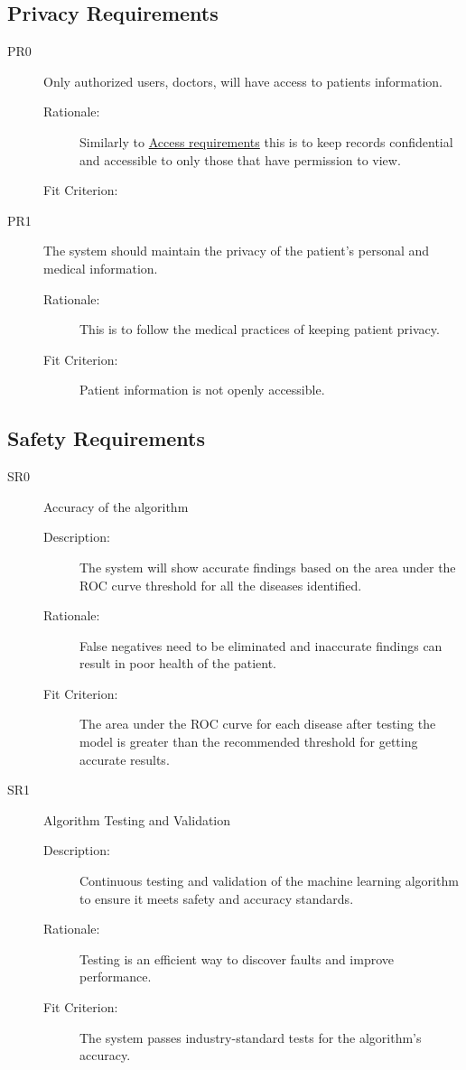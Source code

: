 \documentclass{article}
\begin{document}
\subsection{Privacy Requirements}
\begin{description}
    \item[PR0] Only authorized users, doctors, will have access to patients information. 
    \begin{description}
        \item[Rationale:] Similarly to \hyperlink{AR0}{Access requirements} this is to keep records confidential and accessible to only those that have permission to view.
        \item[Fit Criterion:] 
    \end{description}
    \item[PR1] The system should maintain the privacy of the patient’s personal and medical information.
    \begin{description}
        \item[Rationale:] This is to follow the medical practices of keeping patient privacy. 
        \item[Fit Criterion:] Patient information is not openly accessible. 
    \end{description}
\end{description}

\subsection{Safety Requirements}
\begin{description}
    \item[SR0] Accuracy of the algorithm
    \begin{description}
        \item[Description:] The system will show accurate findings based on the area under the ROC curve threshold for all the diseases identified.
        \item[Rationale:] False negatives need to be eliminated and inaccurate findings can result in poor health of the patient.
        \item[Fit Criterion:] The area under the ROC curve for each disease after testing the model is greater than the recommended threshold for getting accurate results.
    \end{description}
\end{description}

\begin{description}
    \item[SR1] Algorithm Testing and Validation
    \begin{description}
        \item[Description:] Continuous testing and validation of the machine learning algorithm to ensure it meets safety and accuracy standards. 
        \item[Rationale:] Testing is an efficient way to discover faults and improve performance.
        \item[Fit Criterion:] The system passes industry-standard tests for the algorithm's accuracy.
    \end{description}
\end{description}
\end{document}
